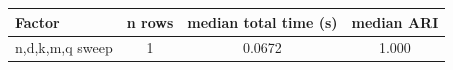 \begin{tabular}{lccc}
\toprule
Factor & n rows & median total time (s) & median ARI \\
\midrule
n,d,k,m,q sweep & 1 & 0.0672 & 1.000 \\
\bottomrule
\end{tabular}
